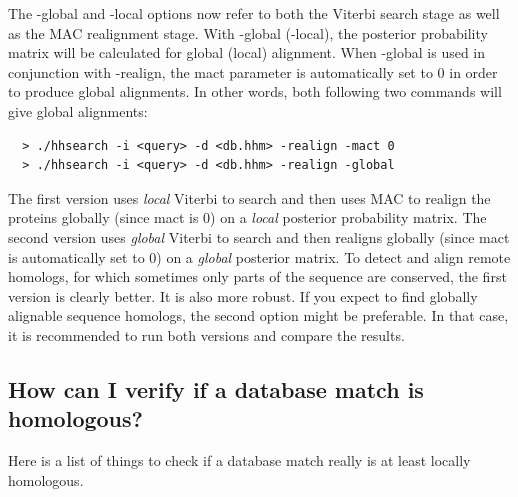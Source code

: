 \documentclass[11pt,a4paper]{article}
\begin{document}
The -global and -local options now refer to both the Viterbi search stage as 
well as the MAC realignment stage. With -global (-local), the posterior probability 
matrix will be calculated for global (local) alignment. When -global is used in 
conjunction with -realign, the mact parameter is automatically set to 0 in order to 
produce global alignments. In other words, both following two commands will give 
global alignments:
\begin{verbatim}
  > ./hhsearch -i <query> -d <db.hhm> -realign -mact 0
  > ./hhsearch -i <query> -d <db.hhm> -realign -global
\end{verbatim}

The first version uses \emph{local} Viterbi to search and then uses MAC to realign the 
proteins globally (since mact is 0) on a \emph{local} posterior probability matrix. The 
second version uses \emph{global} Viterbi to search and then realigns globally (since mact 
is automatically set to 0) on a \emph{global} posterior matrix. To detect and align remote 
homologs, for which sometimes only parts of the sequence are conserved, the first 
version is clearly better. It is also more robust. If you expect to find globally 
alignable sequence homologs, the second option might be preferable. In that case, 
it is recommended to run both versions and compare the results. 

\subsection{How can I verify if a database match is homologous?}

Here is a list of things to check if a database match really is at least locally homologous.
 
\end{document}
